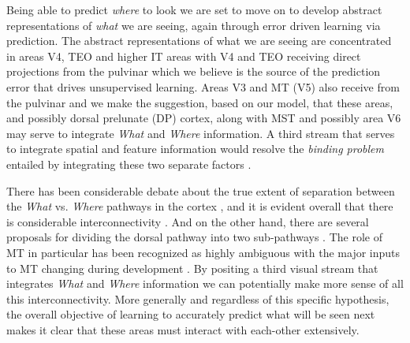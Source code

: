 \documentclass[11pt,twoside]{article}
\newif\myifpdf
\begin{document}
Being able to predict {\em where} to look we are set to move on to develop abstract representations of {\em what} we are seeing, again through error driven learning via prediction. The abstract representations of what we are seeing are concentrated in areas V4, TEO and higher IT areas with V4 and TEO receiving direct projections from the pulvinar which we believe is the source of the prediction error that drives unsupervised learning. Areas V3 and MT (V5) also receive from the pulvinar and we make the suggestion, based on our model, that these areas, and possibly dorsal prelunate (DP) cortex, along with MST and possibly area V6  may serve to integrate {\em What} and {\em Where} information. A third stream that serves to integrate spatial and feature information would resolve the {\em binding problem} entailed by integrating these two separate factors \cite{OReillyBusbySoto03,CerOReilly06}.

There has been considerable debate about the true extent of separation between the {\em What} vs. {\em Where} pathways in the cortex \cite{FreudPlautBehrmann16,deHaanCowey11,SchenkMcIntosh10,SerenoMaunsell98,HongYaminsMajajEtAl16,ZoccolanKouhPoggioEtAl07}, and it is evident overall that there is considerable interconnectivity .  And on the other hand, there are several proposals for dividing the dorsal pathway into two sub-pathways \cite{RizzolattiMatelli03,KravitzSaleemBakerEtAl11,HaakBeckmann17}. The role of MT in particular has been recognized as highly ambiguous \cite{MilnerGoodale06} with the major inputs to MT changing during development \cite{BourneMorrone17}. By positing a third visual stream that integrates {\em What} and {\em Where} information we can potentially make more sense of all this interconnectivity.  More generally and regardless of this specific hypothesis, the overall objective of learning to accurately predict what will be seen next makes it clear that these areas must interact with each-other extensively. 
\end{document}
